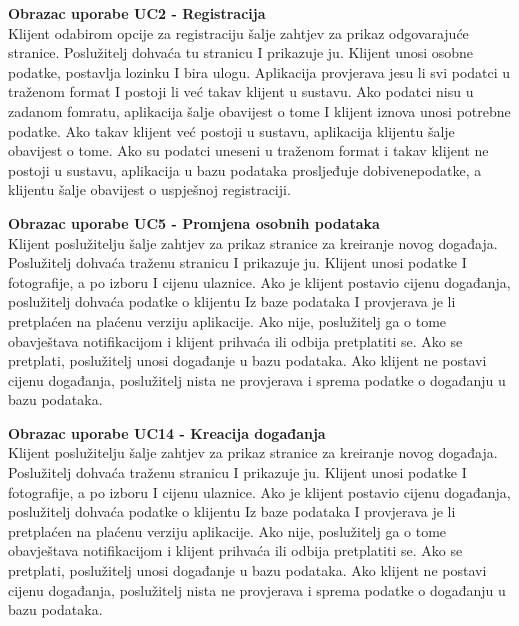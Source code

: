 				
				\textbf{\large Obrazac uporabe UC2 - Registracija}\\
				
				
				Klijent odabirom opcije za registraciju šalje zahtjev za prikaz odgovarajuće stranice. Poslužitelj dohvaća tu stranicu I prikazuje ju. Klijent unosi osobne podatke, postavlja lozinku I bira ulogu. Aplikacija provjerava jesu li svi podatci u traženom format I postoji li već takav klijent u sustavu. Ako podatci nisu u zadanom fomratu, aplikacija šalje obavijest o tome I klijent iznova unosi potrebne podatke. Ako takav klijent već postoji u sustavu, aplikacija klijentu šalje obavijest o tome. Ako su podatci uneseni u traženom format i takav klijent ne postoji u sustavu, aplikacija u bazu podataka prosljeđuje dobivenepodatke, a klijentu šalje obavijest o uspješnoj registraciji.
				
				\eject
	
				
				
				\textbf{\large Obrazac uporabe UC5 - Promjena osobnih podataka}\\


				Klijent poslužitelju šalje zahtjev za prikaz stranice za kreiranje novog događaja. Poslužitelj dohvaća traženu stranicu I prikazuje ju. Klijent unosi podatke I fotografije, a po izboru I cijenu ulaznice. Ako je klijent postavio cijenu događanja, poslužitelj dohvaća podatke o klijentu Iz baze podataka I provjerava je li pretplaćen na plaćenu verziju aplikacije. Ako nije, poslužitelj ga o tome obavještava notifikacijom i klijent prihvaća ili odbija pretplatiti se. Ako se pretplati, poslužitelj unosi događanje u bazu podataka. Ako klijent ne postavi cijenu događanja, poslužitelj nista ne provjerava i sprema podatke o događanju u bazu podataka.
				
				\eject
				
				
				
				\textbf{\large Obrazac uporabe UC14 - Kreacija događanja}\\
				
				Klijent poslužitelju šalje zahtjev za prikaz stranice za kreiranje novog događaja. Poslužitelj dohvaća traženu stranicu I prikazuje ju. Klijent unosi podatke I fotografije, a po izboru I cijenu ulaznice. Ako je klijent postavio cijenu događanja, poslužitelj dohvaća podatke o klijentu Iz baze podataka I provjerava je li pretplaćen na plaćenu verziju aplikacije. Ako nije, poslužitelj ga o tome obavještava notifikacijom i klijent prihvaća ili odbija pretplatiti se. Ako se pretplati, poslužitelj unosi događanje u bazu podataka. Ako klijent ne postavi cijenu događanja, poslužitelj nista ne provjerava i sprema podatke o događanju u bazu podataka.
				
